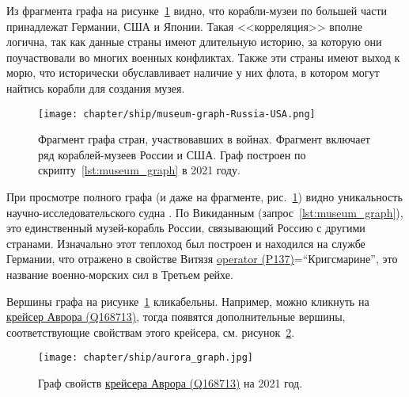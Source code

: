Из фрагмента графа на рисунке~\ref{fig:museum_graph} видно, 
что корабли-музеи по большей части принадлежат Германии, США и Японии. 
Такая <<корреляция>> вполне логична, так как данные страны имеют длительную историю, 
за которую они поучаствовали во многих военных конфликтах. 
Также эти страны имеют выход к морю, что исторически обуславливает наличие у них флота, 
в котором могут найтись корабли для создания музея.

\begin{figure}[h]
  \texttt{[image: chapter/ship/museum-graph-Russia-USA.png]}
  \caption[Граф стран и кораблей-музеев, 2021 год.]{Фрагмент графа стран, участвовавших в войнах. Фрагмент включает ряд кораблей-музеев России и США. Граф построен по скрипту~\protect\ref{lst:museum_graph} в 2021 году.}%
  \label{fig:museum_graph}%
\end{figure}

При просмотре полного графа (и даже на фрагменте, рис.~\ref{fig:museum_graph}) 
видно уникальность научно-исследовательского судна . 
По Викиданным (запрос~\ref{lst:museum_graph}), 
это единственный музей-корабль России, связывающий Россию с другими странами. 
Изначально этот теплоход был построен и находился на службе Германии, 
что отражено в свойстве Витязя 
\href{https://www.wikidata.org/wiki/Property:P137}{operator (P137)}=``Кригсмарине'', 
это название военно-морских сил в Третьем рейхе.

Вершины графа на рисунке~\ref{fig:museum_graph} кликабельны. Например, можно кликнуть на \href{https://www.wikidata.org/wiki/Q168713}{крейсер Аврора (Q168713)}, тогда появятся дополнительные вершины, соответствующие свойствам этого крейсера, см. рисунок~\ref{fig:aurora_graph}.

\newpage
\begin{figure}[h]
  \texttt{[image: chapter/ship/aurora\_graph.jpg]}
  \caption[Граф свойств Авроры, 2021 год.]{Граф свойств \href{https://www.wikidata.org/wiki/Q168713}{крейсера Аврора (Q168713)} на 2021 год.}%
  \label{fig:aurora_graph}%
\end{figure}






